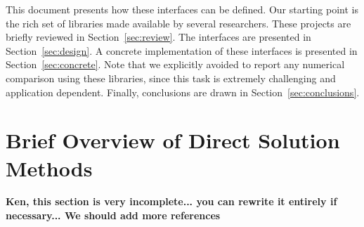 \documentclass[acmtocl]{acmtrans2m}
\begin{document}
\medskip

This document presents how these interfaces can be
defined.  Our starting point is the rich set of libraries made available by
several researchers. These projects are briefly reviewed in
Section~\ref{sec:review}.  The interfaces are presented in
Section~\ref{sec:design}. A concrete implementation of these interfaces is
presented in Section~\ref{sec:concrete}.  Note that we explicitly avoided to
report any numerical comparison using these libraries, since this task
is extremely challenging and application dependent. Finally,
  conclusions are drawn in Section~\ref{sec:conclusions}. 

\section{Brief Overview of Direct Solution Methods}
\label{sec:theory}

{\bf Ken, this section is very incomplete... you can rewrite it entirely if
  necessary... We should add more references}



\bigskip
\end{document}
